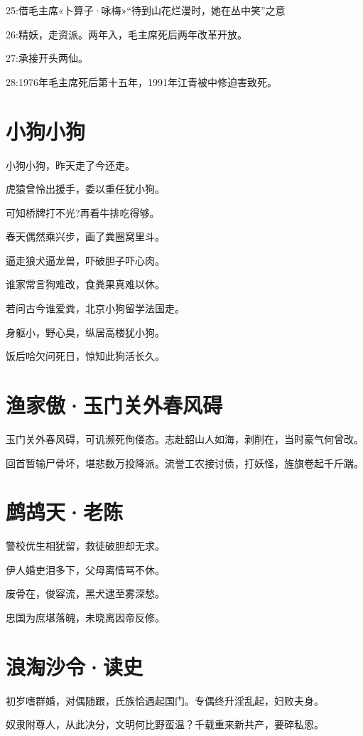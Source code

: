 \documentclass[
]{article}
\begin{document}
25:借毛主席«卜算子·咏梅»``待到山花烂漫时，她在丛中笑''之意

26:精妖，走资派。两年入，毛主席死后两年改革开放。

27:承接开头两仙。

28:1976年毛主席死后第十五年，1991年江青被中修迫害致死。

\section{小狗小狗}\label{ux5c0fux72d7ux5c0fux72d7}

小狗小狗，昨天走了今还走。

虎猿曾怜出援手，委以重任犹小狗。

可知桥牌打不光?再看牛排吃得够。

春天偶然乘兴步，画了粪圈窝里斗。

逼走狼犬逼龙兽，吓破胆子吓心肉。

谁家常言狗难改，食粪果真难以休。

若问古今谁爱粪，北京小狗留学法国走。

身躯小，野心臭，纵居高楼犹小狗。

饭后哈欠问死日，惊知此狗活长久。

\section{渔家傲·玉门关外春风碍}\label{ux6e14ux5bb6ux50b2ux7389ux95e8ux5173ux5916ux6625ux98ceux788d}

玉门关外春风碍，可讥濒死佝偻态。志赴韶山人如海，剥削在，当时豪气何曾改。

回首暂输尸骨坏，堪悲数万投降派。流誉工农接讨债，打妖怪，旌旗卷起千斤踹。

\section{鹧鸪天·老陈}\label{ux9e67ux9e2aux5929ux8001ux9648}

警校优生相犹留，救徒破胆却无求。

伊人婚吏泪多下，父母离情骂不休。

废骨在，俊容流，黑犬逮至雾深愁。

忠国为庶堪落魄，未晓离因帝反修。

\section{浪淘沙令·读史}\label{ux6d6aux6dd8ux6c99ux4ee4ux8bfbux53f2}

初岁嗜群婚，对偶随跟，氏族恰遇起国门。专偶终升淫乱起，妇败夫身。

奴隶附尊人，从此决分，文明何比野蛮温？千载重来新共产，要碎私恩。
\end{document}
